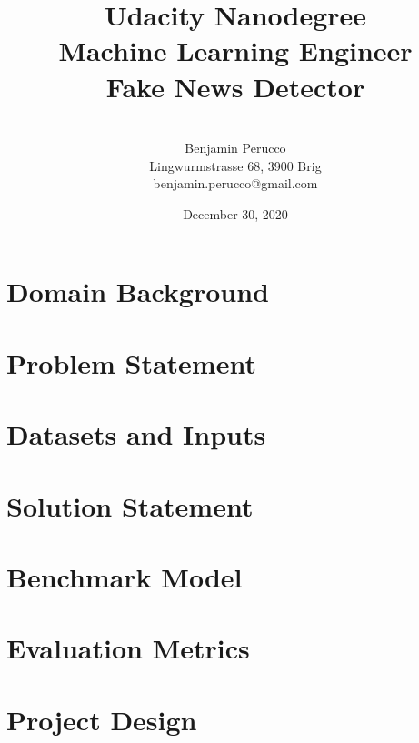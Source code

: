 \documentclass[a4paper]{article}
\begin{document}
\title{{\large Udacity Nanodegree\\Machine Learning Engineer}\\[1.5cm]Fake News Detector}
\author{\\[1.5cm]Benjamin Perucco\\Lingwurmstrasse 68, 3900 Brig\\benjamin.perucco@gmail.com}
\date{December 30, 2020} 
\maketitle
\thispagestyle{empty}

\newpage
\tableofcontents
\thispagestyle{empty}
\newpage

\section{Domain Background}

\section{Problem Statement}

\section{Datasets and Inputs}

\section{Solution Statement}

\section{Benchmark Model}

\section{Evaluation Metrics}

\section{Project Design}
\end{document}
